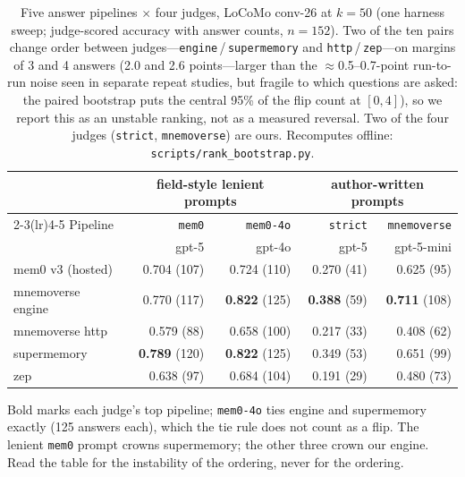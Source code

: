 \documentclass[11pt]{article}
\begin{document}
\begin{table}[t]
\centering
\caption{Five answer pipelines $\times$ four judges, LoCoMo conv-26 at $k=50$ (one harness sweep; judge-scored accuracy with answer counts, $n=152$). Two of the ten pairs change order between judges---\texttt{engine}\,/\,\texttt{supermemory} and \texttt{http}\,/\,\texttt{zep}---on margins of 3 and 4 answers (2.0 and 2.6 points---larger than the $\approx$0.5--0.7-point run-to-run noise seen in separate repeat studies, but fragile to which questions are asked: the paired bootstrap puts the central 95\% of the flip count at $[0,4]$), so we report this as an unstable ranking, not as a measured reversal. Two of the four judges (\texttt{strict}, \texttt{mnemoverse}) are ours. Recomputes offline: \texttt{scripts/rank\_bootstrap.py}.}
\label{tab:rank-reversal}
\small
\begin{tabular}{@{}lrrrr@{}}
\toprule
& \multicolumn{2}{c}{field-style lenient prompts} & \multicolumn{2}{c}{author-written prompts} \\
\cmidrule(lr){2-3}\cmidrule(lr){4-5}
Pipeline & \texttt{mem0} & \texttt{mem0-4o} & \texttt{strict} & \texttt{mnemoverse} \\
& \footnotesize gpt-5 & \footnotesize gpt-4o & \footnotesize gpt-5 & \footnotesize gpt-5-mini \\
\midrule
mem0 v3 (hosted)  & 0.704 (107) & 0.724 (110) & 0.270 (41) & 0.625 (95) \\
mnemoverse engine & 0.770 (117) & \textbf{0.822} (125) & \textbf{0.388} (59) & \textbf{0.711} (108) \\
mnemoverse http   & 0.579 (88)  & 0.658 (100) & 0.217 (33) & 0.408 (62) \\
supermemory       & \textbf{0.789} (120) & \textbf{0.822} (125) & 0.349 (53) & 0.651 (99) \\
zep               & 0.638 (97)  & 0.684 (104) & 0.191 (29) & 0.480 (73) \\
\bottomrule
\end{tabular}

\vspace{2pt}
{\footnotesize Bold marks each judge's top pipeline; \texttt{mem0-4o} ties engine and supermemory exactly (125 answers each), which the tie rule does not count as a flip. The lenient \texttt{mem0} prompt crowns supermemory; the other three crown our engine. Read the table for the instability of the ordering, never for the ordering.}
\end{table}
\end{document}
